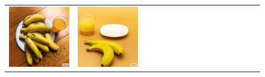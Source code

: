 \begin{figure}
\begin{adjustwidth}{-0.8in}{-0.5in}
\begin{tabular}{cccccccccccccccccccc}
\multicolumn{3}{c}{\includegraphics[width=\twobytwocolwidth\textwidth]{figures/limitations/banana_juice_1.jpg}} &
\multicolumn{3}{c}{\includegraphics[width=\twobytwocolwidth\textwidth]{figures/limitations/banana_juice_2.jpg}} \\

\end{tabular}
\end{adjustwidth}
\end{figure}
